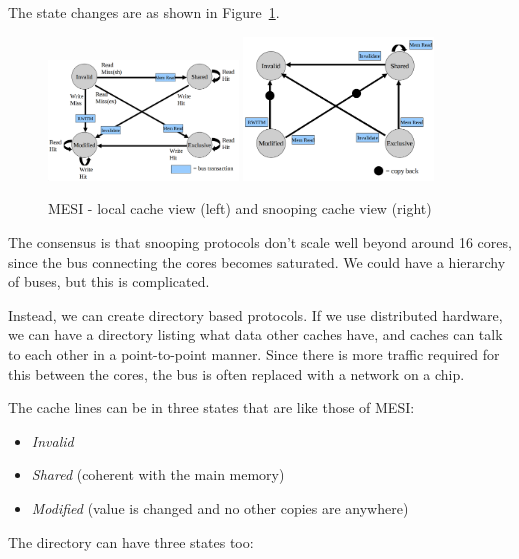 The state changes are as shown in Figure~\ref{MESI}.


\begin{figure}[H]
  \includegraphics[width=0.45\textwidth]{images/MESI1}
  \includegraphics[width=0.45\textwidth]{images/MESI2}
  \caption{MESI - local cache view (left) and snooping cache view (right)}
  \label{MESI}
\end{figure}

The consensus is that snooping protocols don't scale well beyond around 16
cores, since the bus connecting the cores becomes saturated. We could have a
hierarchy of buses, but this is complicated.

Instead, we can create directory based protocols. If we use distributed
hardware, we can have a directory listing what data other caches have, and
caches can talk to each other in a point-to-point manner. Since there is more
traffic required for this between the cores, the bus is often replaced with a
network on a chip.

The cache lines can be in three states that are like those of MESI:

\begin{itemize}
  \item \textit{Invalid}
  \item \textit{Shared} (coherent with the main memory)
  \item \textit{Modified} (value is changed and no other copies are anywhere)
\end{itemize}

The directory can have three states too:

